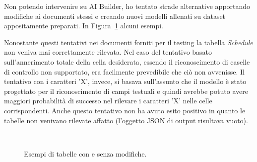 Non potendo intervenire su AI Builder, ho tentato strade alternative apportando modifiche ai documenti stessi e creando nuovi modelli allenati su dataset appositamente preparati. In Figura~\ref{fig:tabelleConSenzaMod} alcuni esempi.

Nonostante questi tentativi nei documenti forniti per il testing la tabella \textit{Schedule} non veniva mai correttamente rilevata. Nel caso del tentativo basato sull'annerimento totale della cella desiderata, essendo il riconoscimento di caselle di controllo non supportato, era facilmente prevedibile che ciò non avvenisse.
Il tentativo con i caratteri 'X', invece, si basava sull'assunto che il modello è stato progettato per il riconoscimento di campi testuali e quindi avrebbe potuto avere maggiori probabilità di successo nel rilevare i caratteri 'X' nelle celle corrispondenti. Anche questo tentativo non ha avuto esito positivo in quanto le tabelle non venivano rilevate affatto (l'oggetto JSON di output risultava vuoto).

\begin{figure}
  \centering
   \quad
   \\
     \quad
  \caption{Esempi di tabelle con e senza modifiche.}
  \label{fig:tabelleConSenzaMod}
\end{figure}

